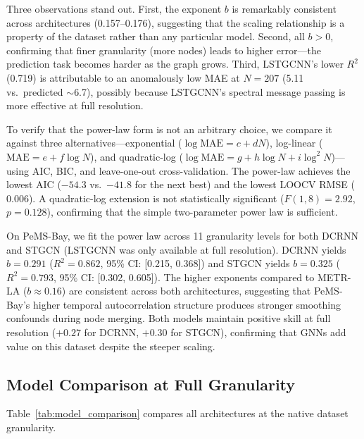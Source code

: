 \documentclass[letterpaper]{article}
\begin{document}
Three observations stand out. First, the exponent $b$ is remarkably consistent across architectures (0.157--0.176), suggesting that the scaling relationship is a property of the dataset rather than any particular model. Second, all $b > 0$, confirming that finer granularity (more nodes) leads to higher error---the prediction task becomes harder as the graph grows. Third, LSTGCNN's lower $R^2$ (0.719) is attributable to an anomalously low MAE at $N = 207$ (5.11 vs.\ predicted $\sim$6.7), possibly because LSTGCNN's spectral message passing is more effective at full resolution.

To verify that the power-law form is not an arbitrary choice, we compare it against three alternatives---exponential ($\log\text{MAE} = c + dN$), log-linear ($\text{MAE} = e + f\log N$), and quadratic-log ($\log\text{MAE} = g + h\log N + i\log^2 N$)---using AIC, BIC, and leave-one-out cross-validation. The power-law achieves the lowest AIC ($-54.3$ vs.\ $-41.8$ for the next best) and the lowest LOOCV RMSE ($0.006$). A quadratic-log extension is not statistically significant ($F(1,8) = 2.92$, $p = 0.128$), confirming that the simple two-parameter power law is sufficient.

On PeMS-Bay, we fit the power law across 11 granularity levels for both DCRNN and STGCN (LSTGCNN was only available at full resolution). DCRNN yields $b = 0.291$ ($R^2 = 0.862$, 95\% CI: [0.215, 0.368]) and STGCN yields $b = 0.325$ ($R^2 = 0.793$, 95\% CI: [0.302, 0.605]). The higher exponents compared to METR-LA ($b \approx 0.16$) are consistent across both architectures, suggesting that PeMS-Bay's higher temporal autocorrelation structure produces stronger smoothing confounds during node merging. Both models maintain positive skill at full resolution ($+0.27$ for DCRNN, $+0.30$ for STGCN), confirming that GNNs add value on this dataset despite the steeper scaling.

\subsection{Model Comparison at Full Granularity}

Table~\ref{tab:model_comparison} compares all architectures at the native dataset granularity.
\end{document}
